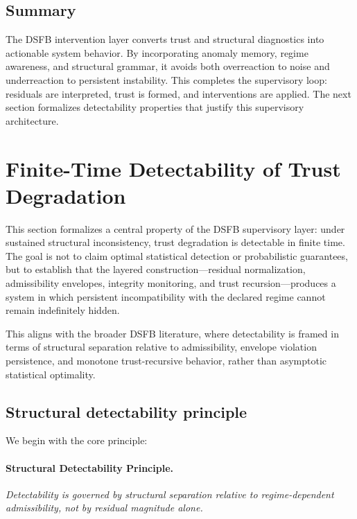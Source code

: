 \documentclass[11pt,letterpaper]{article}
\theoremstyle{gcresult}
\theoremstyle{definition}
\begin{document}

\subsection{Summary}

The DSFB intervention layer converts trust and structural diagnostics into actionable system behavior. By incorporating anomaly memory, regime awareness, and structural grammar, it avoids both overreaction to noise and underreaction to persistent instability. This completes the supervisory loop: residuals are interpreted, trust is formed, and interventions are applied. The next section formalizes detectability properties that justify this supervisory architecture.



\section{Finite-Time Detectability of Trust Degradation}
\label{sec:detectability}

This section formalizes a central property of the DSFB supervisory layer: under sustained structural inconsistency, trust degradation is detectable in finite time. The goal is not to claim optimal statistical detection or probabilistic guarantees, but to establish that the layered construction—residual normalization, admissibility envelopes, integrity monitoring, and trust recursion—produces a system in which persistent incompatibility with the declared regime cannot remain indefinitely hidden.

This aligns with the broader DSFB literature, where detectability is framed in terms of structural separation relative to admissibility, envelope violation persistence, and monotone trust-recursive behavior, rather than asymptotic statistical optimality. 


\subsection{Structural detectability principle}

We begin with the core principle:

\paragraph{Structural Detectability Principle.}
\emph{Detectability is governed by structural separation relative to regime-dependent admissibility, not by residual magnitude alone.}
\end{document}
